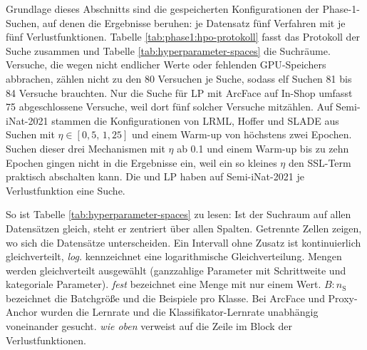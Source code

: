 Grundlage dieses Abschnitts sind die gespeicherten Konfigurationen der Phase-1-Suchen, auf denen die Ergebnisse beruhen: je Datensatz fünf Verfahren mit je fünf Verlustfunktionen. Tabelle \ref{tab:phase1:hpo-protokoll} fasst das Protokoll der Suche zusammen und Tabelle \ref{tab:hyperparameter-spaces} die Suchräume. Versuche, die wegen nicht endlicher Werte oder fehlenden \ac{GPU}-Speichers abbrachen, zählen nicht zu den 80 Versuchen je Suche, sodass elf Suchen 81 bis 84 Versuche brauchten. Nur die Suche für \ac{LP} mit ArcFace auf In-Shop umfasst 75 abgeschlossene Versuche, weil dort fünf solcher Versuche mitzählen. Auf Semi-iNat-2021 stammen die Konfigurationen von \ac{LRML}, Hoffer und \ac{SLADE} aus Suchen mit $\eta\in[0{,}5,\,1{,}25]$ und einem Warm-up von höchstens zwei Epochen. Suchen dieser drei Mechanismen mit $\eta$ ab \num{0.1} und einem Warm-up bis zu zehn Epochen gingen nicht in die Ergebnisse ein, weil ein so kleines $\eta$ den \ac{SSL}-Term praktisch abschalten kann. Die \UEBL und \ac{LP} haben auf Semi-iNat-2021 je Verlustfunktion eine Suche.

 

So ist Tabelle \ref{tab:hyperparameter-spaces} zu lesen: Ist der Suchraum auf allen Datensätzen gleich, steht er zentriert über allen Spalten. Getrennte Zellen zeigen, wo sich die Datensätze unterscheiden. Ein Intervall ohne Zusatz ist kontinuierlich gleichverteilt, \emph{log.} kennzeichnet eine logarithmische Gleichverteilung. Mengen werden gleichverteilt ausgewählt (ganzzahlige Parameter mit Schrittweite und kategoriale Parameter). \emph{fest} bezeichnet eine Menge mit nur einem Wert. $B{:}n_{\mathrm{S}}$ bezeichnet die Batchgröße und die Beispiele pro Klasse. Bei ArcFace und Proxy-Anchor wurden die Lernrate und die Klassifikator-Lernrate unabhängig voneinander gesucht. \emph{wie oben} verweist auf die Zeile im Block der Verlustfunktionen.


\clearpage %






